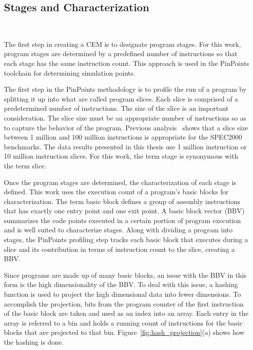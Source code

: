 \subsection{Stages and Characterization}~\label{sec:meth_stages-char}

The first step in creating a CEM is to designate program stages.
For this work, program stages are determined by a
predefined number of instructions so that each stage has the same
instruction count. This approach is used in the PinPoints
toolchain for determining simulation points.

The first step in the PinPoints methodology is to profile the run of a
program by splitting it up into what are called program slices. Each
slice is comprised of a predetermined number of instructions. The size
of the slice is an important consideration. The slice size must be an
appropriate number of instructions so as to capture the behavior of
the program. Previous analysis~\cite{bbv-2, pgss-sim} shows that a slice
size between 1 million and 100 million instructions is appropriate for the
SPEC2000 benchmarks. The data results presented in this
thesis use 1 million instruction or 10 million instruction slices. For this
work, the term stage is synonymous with the term slice.

Once the program stages are determined, the characterization of each stage is
defined. This work uses the execution count of a program's basic blocks for
characterization. The term
basic block defines a group of assembly instructions that
has exactly one entry point and one exit point.
A basic block vector (BBV)~\cite{bbv-1} summarizes
the code points executed in a certain portion of
program execution and is well suited to characterize stages. Along with dividing
a program into stages, the PinPoints profiling step tracks each basic block that
executes during a slice and its contribution in terms of instruction count to
the slice, creating a BBV.

Since programs are made up of many basic blocks,
an issue with the BBV in this form is the high
dimensionality of the BBV. To deal with this issue, a hashing function
is used to project the high dimensional data into fewer dimensions. To
accomplish the projection, bits from the program counter of the first
instruction of the basic block are taken and used as an index into an
array. Each entry in the array is referred to a bin and holds a
running count of instructions for the basic blocks that are projected
to that bin. Figure~\ref{fig:hash_projection}(a) shows how the hashing
is done.

